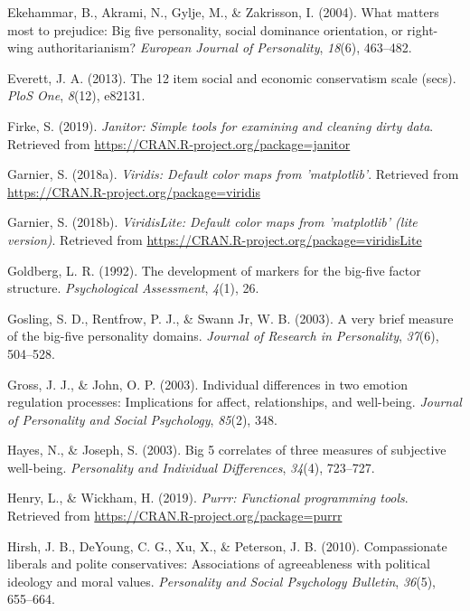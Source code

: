 \documentclass[man]{apa6}
\begin{document}
\hypertarget{ref-ekehammar2004matters}{}
Ekehammar, B., Akrami, N., Gylje, M., \& Zakrisson, I. (2004). What
matters most to prejudice: Big five personality, social dominance
orientation, or right-wing authoritarianism? \emph{European Journal of
Personality}, \emph{18}(6), 463--482.

\hypertarget{ref-everett201312}{}
Everett, J. A. (2013). The 12 item social and economic conservatism
scale (secs). \emph{PloS One}, \emph{8}(12), e82131.

\hypertarget{ref-R-janitor}{}
Firke, S. (2019). \emph{Janitor: Simple tools for examining and cleaning
dirty data}. Retrieved from
\url{https://CRAN.R-project.org/package=janitor}

\hypertarget{ref-R-viridis}{}
Garnier, S. (2018a). \emph{Viridis: Default color maps from
'matplotlib'}. Retrieved from
\url{https://CRAN.R-project.org/package=viridis}

\hypertarget{ref-R-viridisLite}{}
Garnier, S. (2018b). \emph{ViridisLite: Default color maps from
'matplotlib' (lite version)}. Retrieved from
\url{https://CRAN.R-project.org/package=viridisLite}

\hypertarget{ref-goldberg1992development}{}
Goldberg, L. R. (1992). The development of markers for the big-five
factor structure. \emph{Psychological Assessment}, \emph{4}(1), 26.

\hypertarget{ref-gosling2003very}{}
Gosling, S. D., Rentfrow, P. J., \& Swann Jr, W. B. (2003). A very brief
measure of the big-five personality domains. \emph{Journal of Research
in Personality}, \emph{37}(6), 504--528.

\hypertarget{ref-gross2003individual}{}
Gross, J. J., \& John, O. P. (2003). Individual differences in two
emotion regulation processes: Implications for affect, relationships,
and well-being. \emph{Journal of Personality and Social Psychology},
\emph{85}(2), 348.

\hypertarget{ref-hayes2003big}{}
Hayes, N., \& Joseph, S. (2003). Big 5 correlates of three measures of
subjective well-being. \emph{Personality and Individual Differences},
\emph{34}(4), 723--727.

\hypertarget{ref-R-purrr}{}
Henry, L., \& Wickham, H. (2019). \emph{Purrr: Functional programming
tools}. Retrieved from \url{https://CRAN.R-project.org/package=purrr}

\hypertarget{ref-hirsh2010compassionate}{}
Hirsh, J. B., DeYoung, C. G., Xu, X., \& Peterson, J. B. (2010).
Compassionate liberals and polite conservatives: Associations of
agreeableness with political ideology and moral values.
\emph{Personality and Social Psychology Bulletin}, \emph{36}(5),
655--664.
\end{document}
